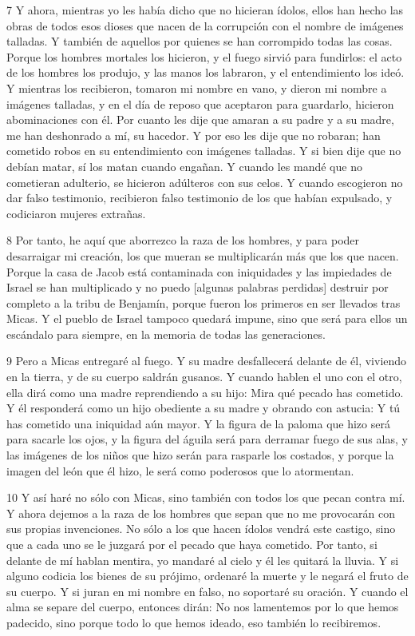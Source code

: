 \par 7 Y ahora, mientras yo les había dicho que no hicieran ídolos, ellos han hecho las obras de todos esos dioses que nacen de la corrupción con el nombre de imágenes talladas. Y también de aquellos por quienes se han corrompido todas las cosas. Porque los hombres mortales los hicieron, y el fuego sirvió para fundirlos: el acto de los hombres los produjo, y las manos los labraron, y el entendimiento los ideó. Y mientras los recibieron, tomaron mi nombre en vano, y dieron mi nombre a imágenes talladas, y en el día de reposo que aceptaron para guardarlo, hicieron abominaciones con él. Por cuanto les dije que amaran a su padre y a su madre, me han deshonrado a mí, su hacedor. Y por eso les dije que no robaran; han cometido robos en su entendimiento con imágenes talladas. Y si bien dije que no debían matar, sí los matan cuando engañan. Y cuando les mandé que no cometieran adulterio, se hicieron adúlteros con sus celos. Y cuando escogieron no dar falso testimonio, recibieron falso testimonio de los que habían expulsado, y codiciaron mujeres extrañas.

\par 8 Por tanto, he aquí que aborrezco la raza de los hombres, y para poder desarraigar mi creación, los que mueran se multiplicarán más que los que nacen. Porque la casa de Jacob está contaminada con iniquidades y las impiedades de Israel se han multiplicado y no puedo [algunas palabras perdidas] destruir por completo a la tribu de Benjamín, porque fueron los primeros en ser llevados tras Micas. Y el pueblo de Israel tampoco quedará impune, sino que será para ellos un escándalo para siempre, en la memoria de todas las generaciones.

\par 9 Pero a Micas entregaré al fuego. Y su madre desfallecerá delante de él, viviendo en la tierra, y de su cuerpo saldrán gusanos. Y cuando hablen el uno con el otro, ella dirá como una madre reprendiendo a su hijo: Mira qué pecado has cometido. Y él responderá como un hijo obediente a su madre y obrando con astucia: Y tú has cometido una iniquidad aún mayor. Y la figura de la paloma que hizo será para sacarle los ojos, y la figura del águila será para derramar fuego de sus alas, y las imágenes de los niños que hizo serán para rasparle los costados, y porque la imagen del león que él hizo, le será como poderosos que lo atormentan.

\par 10 Y así haré no sólo con Micas, sino también con todos los que pecan contra mí. Y ahora dejemos a la raza de los hombres que sepan que no me provocarán con sus propias invenciones. No sólo a los que hacen ídolos vendrá este castigo, sino que a cada uno se le juzgará por el pecado que haya cometido. Por tanto, si delante de mí hablan mentira, yo mandaré al cielo y él les quitará la lluvia. Y si alguno codicia los bienes de su prójimo, ordenaré la muerte y le negará el fruto de su cuerpo. Y si juran en mi nombre en falso, no soportaré su oración. Y cuando el alma se separe del cuerpo, entonces dirán: No nos lamentemos por lo que hemos padecido, sino porque todo lo que hemos ideado, eso también lo recibiremos.

